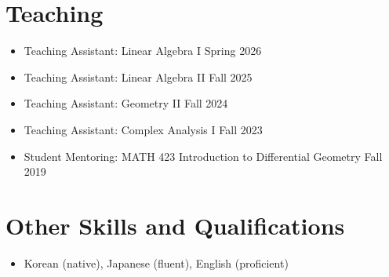 \documentclass[11pt,a4paper]{article}
\begin{document}
\section*{Teaching}
\begin{itemize}
\item
	Teaching Assistant: Linear Algebra I
	\hfill{\small Spring 2026}
\item
	Teaching Assistant: Linear Algebra II
	\hfill{\small Fall 2025}
\item
	Teaching Assistant: Geometry II
	\hfill{\small Fall 2024}
\item
	Teaching Assistant: Complex Analysis I
	\hfill{\small Fall 2023}
\item
	Student Mentoring: MATH 423 Introduction to Differential Geometry
	\hfill{\small Fall 2019}\\
\end{itemize}




\section*{Other Skills and Qualifications}
\begin{itemize}
\item Korean (native), Japanese (fluent), English (proficient)
\end{itemize}
	
\end{document}
